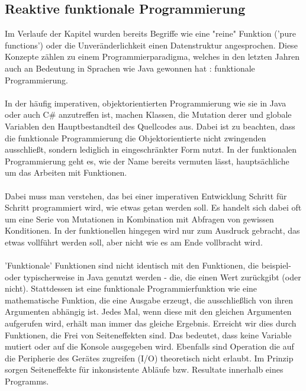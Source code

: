 \subsection{Reaktive funktionale Programmierung}
Im Verlaufe der Kapitel wurden bereits Begriffe wie eine "reine" Funktion ('pure functions') oder die Unveränderlichkeit einen Datenstruktur angesprochen. Diese Konzepte zählen zu einem Programmierparadigma, welches in den letzten Jahren auch an Bedeutung in Sprachen wie Java gewonnen hat
\cite{javaFunctionalProgramming}
: funktionale Programmierung.
\\\\
In der häufig imperativen, objektorientierten Programmierung wie sie in Java oder auch C\# anzutreffen ist, machen Klassen, die Mutation derer und globale Variablen den Hauptbestandteil des Quellcodes aus. Dabei ist zu beachten, dass die funktionale Programmierung die Objektorientierte nicht zwingenden ausschließt, sondern lediglich in eingeschränkter Form nutzt. In der funktionalen Programmierung geht es, wie der Name bereits vermuten lässt, hauptsächliche um das Arbeiten mit Funktionen.
\\\\ 
Dabei muss man verstehen, das bei einer imperativen Entwicklung Schritt für Schritt programmiert wird, wie etwas getan werden soll. Es handelt sich dabei oft um eine Serie von Mutationen in Kombination mit Abfragen von gewissen Konditionen. In der funktionellen hingegen wird nur zum Ausdruck gebracht, das etwas vollführt werden soll, aber nicht wie es am Ende vollbracht wird. 
\\\\
'Funktionale' Funktionen sind nicht identisch mit den Funktionen, die beispiel- oder typischerweise in Java genutzt werden - die, die einen Wert zurückgibt (oder nicht). Stattdessen ist eine funktionale Programmierfunktion wie eine mathematische Funktion, die eine Ausgabe erzeugt, die ausschließlich von ihren Argumenten abhängig ist. Jedes Mal, wenn diese mit den gleichen Argumenten aufgerufen wird, erhält man immer das gleiche Ergebnis. Erreicht wir dies durch Funktionen, die Frei von Seiteneffekten sind. Das bedeutet, dass keine Variable mutiert oder auf die Konsole ausgegeben wird. Ebenfalls sind Operation die auf die Peripherie des Gerätes zugreifen (I/O) theoretisch nicht erlaubt. Im Prinzip sorgen Seiteneffekte für inkonsistente Abläufe bzw. Resultate innerhalb eines Programms.
\\\\
